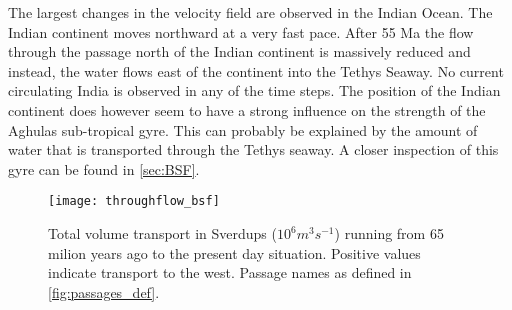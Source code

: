 The largest changes in the velocity field are observed in the Indian Ocean. The Indian continent moves northward at a very fast pace. After 55 Ma the flow through the passage north of the Indian continent is massively reduced and instead, the water flows east of the continent into the Tethys Seaway. No current circulating India is observed in any of the time steps. The position of the Indian continent does however seem to have a strong influence on the strength of the Aghulas sub-tropical gyre. This can probably be explained by the amount of water that is transported through the Tethys seaway. A closer inspection of this gyre can be found in \cref{sec:BSF}.

\begin{figure}[H]
	\texttt{[image: throughflow\_bsf]}
	\caption{Total volume transport in Sverdups ($10^6 m^3 s^{-1}$) running from 65 milion years ago to the present day situation. Positive values indicate transport to the west. Passage names as defined in \cref{fig:passages_def}.}
	\label{fig:throughflow}
\end{figure}